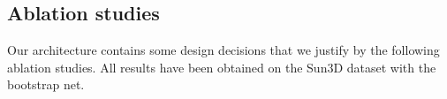 \documentclass[10pt,twocolumn,letterpaper]{article}
\begin{document}



\subsection{Ablation studies}
\label{sec:ablation_study}
Our architecture contains some design decisions that we justify by the following ablation studies. 
All results have been obtained on the Sun3D dataset with the bootstrap net.
\end{document}
